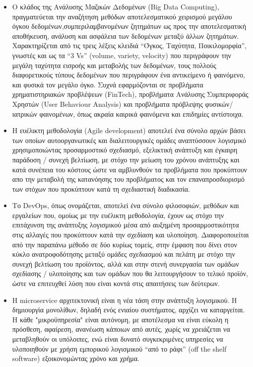 \documentclass{article}
\begin{document}
\begin{itemize}
\item Ο κλάδος της Ανάλυσης Μαζικών Δεδομένων (Big Data Computing), πραγματεύεται την αναζήτηση μεθόδων αποτελεσματικού χειρισμού μεγάλου όγκου δεδομένων,συμπεριλαμβανομένων ζητημάτων ως προς την αποτελεσματική αποθήκευση, ανάλυση και ασφάλεια των δεδομένων μεταξύ άλλων ζητημάτων. Χαρακτηρίζεται από τις τρεις λέξεις κλειδιά “Όγκος, Ταχύτητα, Ποικιλομορφία”, γνωστές και ως τα “3 Vs” (volume, variety, velocity) που περιγράφουν την μεγάλη ταχύτητα εισροής και μεταβολής των δεδομένων, τους πολλούς διαφορετικούς τύπους δεδομένων που περιγράφουν ένα αντικείμενο ή φαινόμενο, και φυσικά τον μεγάλο όγκο. Συχνά εφαρμόζονται σε προβλήματα χρηματιστηριακών προβλέψεων (FinTech), προβλήματα Ανάλυσης Συμπεριφοράς Χρηστών (User Behaviour Analysis) και προβλήματα πρόβλεψης φυσικών/ιατρικών φαινομένων, όπως ακραία καιρικά φαινόμενα και επιδημίες αντίστοιχα.
\item Η ευέλικτη μεθοδολογία (Agile development) αποτελεί ένα σύνολο αρχών βάσει των οποίων αυτοοργανωτικές και διαλειτουργικές ομάδες αναπτύσσουν λογισμικό χρησιμοποιώντας προσαρμοστικό σχεδιασμό, εξελικτική ανάπτυξη και έγκαιρη παράδοση / συνεχή βελτίωση, με στόχο την μείωση του χρόνου ανάπτυξης και κατά συνέπεια του κόστους ώστε να αμβλυνθούν τα προβλήματα που προκύπτουν απο την μεταβολή της κατανόησης του προβλήματος και τον επαναπροσδιορισμό των στόχων που προκύπτουν κατά τη σχεδιαστική διαδικασία.
\item Το DevOps, όπως ονομάζεται, αποτελεί ένα σύνολο φιλοσοφιών, μεθόδων και εργαλείων που, ομοίως με την ευέλικτη μεθοδολογία, έχουν ως στόχο την επιτάχυνση της ανάπτυξης λογισμικού μέσα από αυξημένη προσαρμοστικότητα στις αλλαγές που προκύπτουν κατά την σχεδίαση και υλοποίηση. Διαφοροποιείται από την παραπάνω μέθοδο σε δύο κυρίως τομείς, στην έμφαση που δίνει στον κύκλο ανατροφοδότησης μεταξύ ομάδες σχεδιασμού και πελάτη με στόχο την συνεχή βελτίωση του προϊόντος, αλλά και στην στενή συνεργασία των ομάδων σχεδίασης / υλοποίησης και των ομάδων που θα λειτουργήσουν το τελικό προϊόν, ώστε να επιτευχθεί λύση που είναι κοντά στις απαιτήσεις των δεύτερων.
\item Η microservice αρχιτεκτονική είναι η νέα τάση στην ανάπτυξη λογισμικού. Η δημιουργία μονολίθων, δηλαδή ενός ενιαίου συστήματος, αρχίζει να καταργείται. Η κάθε "μικροϋπηρεσία" είναι αυτόνομη, με αποτέλεσμα να είναι εύκολη η πρόσθεση, αφαίρεση, ανανέωση κάποιων από αυτές, χωρίς να χρειάζεται να μεταβληθούν οι υπόλοιπες, ενώ είναι δυνατό συγκεκριμένες υπηρεσίες να υλοποιηθούν με χρήση εμπορικού λογισμικού “από το ράφι” (off the shelf software) εξοικονομώντας χρόνο και χρήμα.

\end{itemize}
\end{document}
